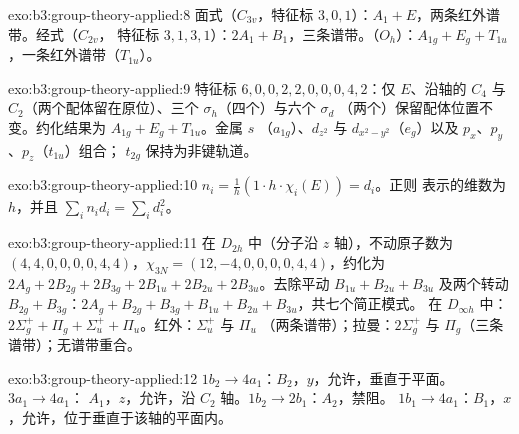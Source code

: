 \begin{solution}{exo:b3:group-theory-applied:8}
面式（$C_{3v}$，特征标 $3, 0, 1$）：$A_1 + E$，两条红外谱带。经式（$C_{2v}$，
特征标 $3, 1, 3, 1$）：$2A_1 + B_1$，三条谱带。（$O_h$）：$A_{1g} + E_g
+ T_{1u}$，一条红外谱带（$T_{1u}$）。
\end{solution}

\begin{solution}{exo:b3:group-theory-applied:9}
特征标 $6, 0, 0, 2, 2, 0, 0, 0, 4, 2$：仅 $E$、沿轴的 $C_4$ 与
$C_2$（两个配体留在原位）、三个 $\sigma_h$（四个）与六个 $\sigma_d$
（两个）保留配体位置不变。约化结果为 $A_{1g} + E_g + T_{1u}$。金属 $s$
（$a_{1g}$）、$d_{z^2}$ 与 $d_{x^2-y^2}$（$e_g$）以及 $p_x$、$p_y$、$p_z$（$t_{1u}$）组合；
$t_{2g}$ 保持为非键轨道。
\end{solution}

\begin{solution}{exo:b3:group-theory-applied:10}
$n_i = \frac1h(1\cdot h\cdot\chi_i(E)) = d_i$。正则
表示的维数为 $h$，并且 $\sum_in_id_i = \sum_id_i^2$。
\end{solution}

\begin{solution}{exo:b3:group-theory-applied:11}
在 $D_{2h}$ 中（分子沿 $z$ 轴），不动原子数为 $(4, 4, 0, 0, 0, 0, 4, 4)$，$\chi_{3N}
= (12, -4, 0, 0, 0, 0, 4, 4)$，约化为 $2A_g + 2B_{2g} + 2B_{3g} + 2B_{1u} + 2B_{2u}
+ 2B_{3u}$。去除平动 $B_{1u} + B_{2u} + B_{3u}$ 及两个转动
$B_{2g} + B_{3g}$：$2A_g + B_{2g} + B_{3g} + B_{1u} + B_{2u} + B_{3u}$，共七个简正模式。
在 $D_{\infty h}$ 中：$2\Sigma_g^+ + \Pi_g + \Sigma_u^+ + \Pi_u$。红外：$\Sigma_u^+$ 与 $\Pi_u$
（两条谱带）；拉曼：$2\Sigma_g^+$ 与 $\Pi_g$（三条谱带）；无谱带重合。
\end{solution}

\begin{solution}{exo:b3:group-theory-applied:12}
$1b_2 \to 4a_1$：$B_2$，$y$，允许，垂直于平面。$3a_1 \to 4a_1$：
$A_1$，$z$，允许，沿 $C_2$ 轴。$1b_2 \to 2b_1$：$A_2$，禁阻。
$1b_1 \to 4a_1$：$B_1$，$x$，允许，位于垂直于该轴的平面内。
\end{solution}

